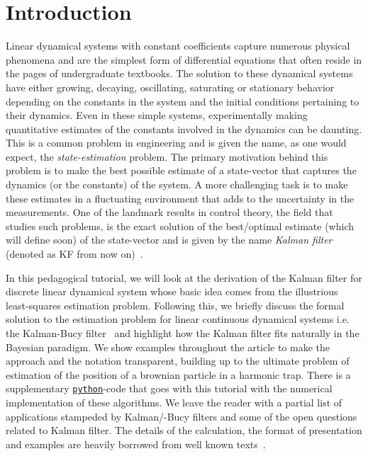 \documentclass{resonance}
\begin{document}
\section{Introduction}
Linear dynamical systems with constant coefficients capture numerous physical phenomena and are the simplest form of differential equations that often reside in the pages of undergraduate textbooks. The solution to these dynamical systems have either growing, decaying, oscillating, saturating or stationary behavior depending on the constants in the system and the initial conditions pertaining to their dynamics. Even in these simple systems, experimentally making quantitative estimates of the constants involved in the dynamics can be daunting. This is a common problem in engineering and is given the name, as one would expect, the \textit{state-estimation} problem. The primary motivation behind this problem is to make the best possible estimate of a state-vector that captures the dynamics (or the constants) of the system. A more challenging task is to make these estimates in a fluctuating environment that adds to the uncertainty in the measurements. One of the landmark results in control theory, the field that studies such problems, is the exact solution of the best/optimal estimate (which will define soon) of the state-vector and is given by the name \textit{Kalman filter} (denoted as KF from now on)~\cite{kalman1960new}.

In this pedagogical tutorial, we will look at the derivation of the Kalman filter for discrete linear dynamical system whose basic idea comes from the illustrious least-squares estimation problem. Following this, we briefly discuss the formal solution to the estimation problem for linear continuous dynamical systems i.e. the Kalman-Bucy filter~\cite{kalman1961new} and highlight how the Kalman filter fits naturally in the Bayesian paradigm. We show examples throughout the article to make the approach and the notation transparent, building up to the ultimate problem of estimation of the position of a brownian particle in a harmonic trap. There is a supplementary \href{https://github.com/sgangaprasath/KFTutorial/blob/main/KFTutorial.ipynb}{\texttt{python}}-code that goes with this tutorial with the numerical implementation of these algorithms. We leave the reader with a partial list of applications stampeded by Kalman/-Bucy filters and some of the open questions related to Kalman filter. The details of the calculation, the format of presentation and examples are heavily borrowed from well known texts~\cite{stengel1994optimal, sorenson1970least, maybeck1982stochastic}.
\end{document}
